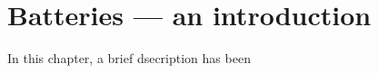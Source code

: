 
\chapter{Batteries --- an introduction} %
In this chapter, a brief dsecription has been 
\label{chap1} %


\newcommand{\keyword}[1]{\textbf{#1}}
\newcommand{\tabhead}[1]{\textbf{#1}}
\newcommand{\code}[1]{\texttt{#1}}
\newcommand{\file}[1]{\texttt{\bfseries#1}}
\newcommand{\option}[1]{\texttt{\itshape#1}}

